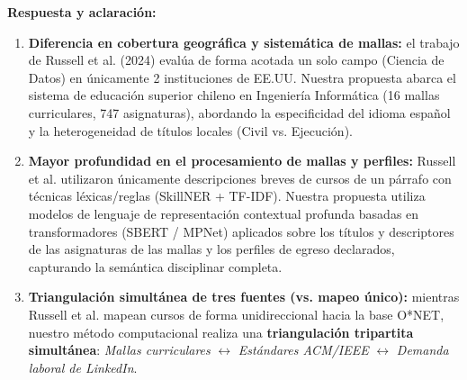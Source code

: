 \vspace{0.4cm}

\noindent
{}

\vspace{0.2cm}

\noindent
\textbf{Respuesta y aclaración:}
\begin{enumerate}[leftmargin=*]
	\item \textbf{Diferencia en cobertura geográfica y sistemática de mallas:} el trabajo de Russell et al. (2024) evalúa de forma acotada un solo campo (Ciencia de Datos) en únicamente 2 instituciones de EE.UU. Nuestra propuesta abarca el sistema de educación superior chileno en Ingeniería Informática (16 mallas curriculares, 747 asignaturas), abordando la especificidad del idioma español y la heterogeneidad de títulos locales (Civil vs. Ejecución).
	\item \textbf{Mayor profundidad en el procesamiento de mallas y perfiles:} Russell et al. utilizaron únicamente descripciones breves de cursos de un párrafo con técnicas léxicas/reglas (SkillNER + TF-IDF). Nuestra propuesta utiliza modelos de lenguaje de representación contextual profunda basadas en transformadores (SBERT / MPNet) aplicados sobre los títulos y descriptores de las asignaturas de las mallas y los perfiles de egreso declarados, capturando la semántica disciplinar completa.
	\item \textbf{Triangulación simultánea de tres fuentes (vs. mapeo único):} mientras Russell et al. mapean cursos de forma unidireccional hacia la base O*NET, nuestro método computacional realiza una \textbf{triangulación tripartita simultánea}: \textit{Mallas curriculares} $\leftrightarrow$ \textit{Estándares ACM/IEEE} $\leftrightarrow$ \textit{Demanda laboral de LinkedIn}.
\end{enumerate}

\newpage

\noindent
{}

